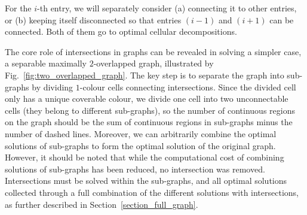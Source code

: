 \documentclass[conference]{IEEEtran}
\begin{document}
For the $i$-th entry, we will separately consider (a) connecting it to other entries, or (b) keeping itself disconnected so that entries $(i-1)$ and $(i+1)$ can be connected. Both of them go to optimal cellular decompositions. 

The core role of intersections in graphs can be revealed in solving a simpler case, a separable maximally $2$-overlapped graph, 
illustrated by Fig.~\ref{fig:two_overlapped_graph}.  
The key step is to separate the graph into sub-graphs by dividing $1$-colour cells connecting intersections. 
Since the divided cell only has a unique coverable colour, we divide one cell into two unconnectable cells (they belong to different sub-graphs), so the number of continuous regions on the graph should be the sum of continuous regions in sub-graphs minus the number of dashed lines. 
Moreover, we can arbitrarily combine the optimal solutions of sub-graphs to form the optimal solution of the original graph. 
However, it should be noted that while the computational cost of combining solutions of sub-graphs has been reduced, no intersection was removed. 
Intersections must be solved within the sub-graphs, and all optimal solutions collected through a full combination of the different solutions with 
intersections, as further described in Section~\ref{section_full_graph}.
\end{document}
